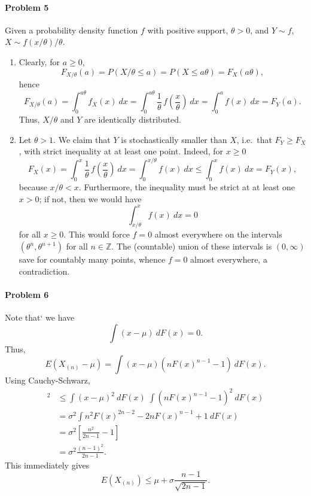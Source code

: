 \documentclass[10pt]{article}
\newcommand{\Z}{\mathbb{Z}}
\begin{document}
    \paragraph{Problem 5} Given a probability density function $f$ with
    positive support, $\theta > 0$, and $Y \sim f$, $X \sim f(x / \theta) /
    \theta$. \begin{enumerate}
        \item Clearly, for $a \geq 0$, \[
            F_{X / \theta}(a) = P(X/ \theta \leq a) = P(X \leq a\theta) =
            F_X(a\theta),
        \] hence \[
            F_{X/\theta}(a) = \int_0^{a\theta} f_X(x)\:dx
            = \int_0^{a\theta} \frac{1}{\theta}\,f\left(\frac{x}{\theta}\right) \:dx
            = \int_0^a f(x)\:dx
            = F_Y(a).
        \] Thus, $X/\theta$ and $Y$ are identically distributed.

        \item Let $\theta > 1$. We claim that $Y$ is stochastically smaller
        than $X$, i.e.\ that $F_Y \geq F_X$, with strict inequality at at
        least one point. Indeed, for $x \geq 0$ \[
            F_X(x) = \int_0^x \frac{1}{\theta}\,
            f\left(\frac{x}{\theta}\right) \:dx
            = \int_0^{x / \theta} f(x)\:dx
            \leq \int_0^x f(x) \:dx
            = F_Y(x),
        \] because $x/\theta < x$. Furthermore, the inequality must be strict
        at at least one $x > 0$; if not, then we would have \[
            \int_{x / \theta}^x f(x) \:dx = 0
        \] for all $x \geq 0$. This would force $f = 0$ almost everywhere on
        the intervals $(\theta^n, \theta^{n + 1})$ for all $n \in \Z$. The
        (countable) union of these intervals is $(0, \infty)$ save for
        countably many points, whence $f = 0$ almost everywhere, a
        contradiction.
    \end{enumerate}



    \paragraph{Problem 6} Note that` we have \[
        \int (x - \mu) \:dF(x) = 0.
    \] Thus, \[
        E(X_{(n)} - \mu) = \int (x - \mu) (n F(x)^{n - 1} - 1) \:dF(x).
    \] Using Cauchy-Schwarz, \begin{align*}
        [E(X_{(n)} - \mu)]^2 &\leq \int (x - \mu)^2 \:dF(x) \;
            \int (nF(x)^{n - 1} - 1)^2 \:dF(x) \\
            &= \sigma^2 \int n^2F(x)^{2n - 2} - 2nF(x)^{n - 1} + 1
            \:dF(x) \\
            &= \sigma^2 \left[\frac{n^2}{2n - 1} - 1\right] \\
            &= \sigma^2 \frac{(n - 1)^2}{2n - 1}.
    \end{align*}
    This immediately gives \[
        E(X_{(n)}) \leq \mu + \sigma \frac{n - 1}{\sqrt{2n - 1}}.
    \]
\end{document}
